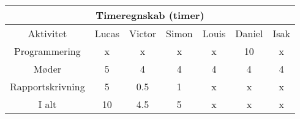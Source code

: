 \centering
\begin{tabular}{ |c|c|c|c|c|c|c|  }
 \hline
 \multicolumn{7}{|c|}{Timeregnskab (timer)} \\
 \hline
 Aktivitet & Lucas & Victor & Simon & Louis & Daniel & Isak\\
 \hline
 
 
 Programmering      & x & x & x & x & 10 & x \\
 
 Møder              & 5 & 4 & 4 & 4 & 4 & 4 \\
 
 Rapportskrivning   & 5 & 0.5 & 1 & x & x & x \\
 
 \hline
 
 I alt              & 10 & 4.5 & 5 & x & x & x \\
 
 
 \hline
\end{tabular}